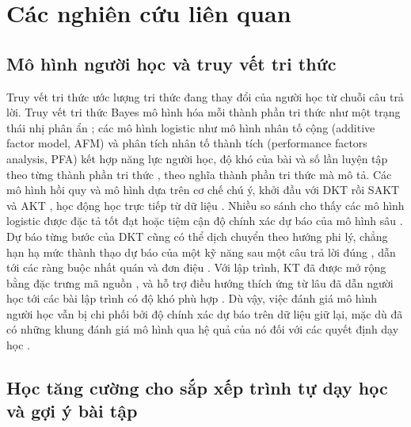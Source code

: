 \section{Các nghiên cứu liên quan}\label{sec:related}

\subsection{Mô hình người học và truy vết tri thức}

Truy vết tri thức ước lượng tri thức đang thay đổi của người học từ chuỗi câu trả lời. Truy vết tri thức Bayes mô hình hóa mỗi thành phần tri thức như một trạng thái nhị phân ẩn \citep{corbett1994bkt}; các mô hình logistic như mô hình nhân tố cộng (additive factor model, AFM) và phân tích nhân tố thành tích (performance factors analysis, PFA) kết hợp năng lực người học, độ khó của bài và số lần luyện tập theo từng thành phần tri thức \citep{cen2006lfa,pavlik2009pfa,pelanek2017learner}, theo nghĩa thành phần tri thức mà \citet{koedinger2012kli} mô tả. Các mô hình hồi quy và mô hình dựa trên cơ chế chú ý, khởi đầu với DKT \citep{piech2015dkt} rồi SAKT và AKT \citep{pandey2019sakt,ghosh2020akt}, học động học trực tiếp từ dữ liệu \citep[xem tổng quan của][]{abdelrahman2023survey}. Nhiều so sánh cho thấy các mô hình logistic được đặc tả tốt đạt hoặc tiệm cận độ chính xác dự báo của mô hình sâu \citep{khajah2016deep,wilson2016basics,gervet2020deep}. Dự báo từng bước của DKT cũng có thể dịch chuyển theo hướng phi lý, chẳng hạn hạ mức thành thạo dự báo của một kỹ năng sau một câu trả lời đúng \citep{yeung2018dktplus}, dẫn tới các ràng buộc nhất quán và đơn điệu \citep{zhang2023cmkt}. Với lập trình, KT đã được mở rộng bằng đặc trưng mã nguồn \citep{shi2022codedkt}, và hỗ trợ điều hướng thích ứng từ lâu đã dẫn người học tới các bài lập trình có độ khó phù hợp \citep{hsiao2010guiding,brusilovsky2007user}. Dù vậy, việc đánh giá mô hình người học vẫn bị chi phối bởi độ chính xác dự báo trên dữ liệu giữ lại, mặc dù đã có những khung đánh giá mô hình qua hệ quả của nó đối với các quyết định dạy học \citep{gonzalezbrenes2015leopard,huang2015multifaceted}.

\subsection{Học tăng cường cho sắp xếp trình tự dạy học và gợi ý bài tập}

